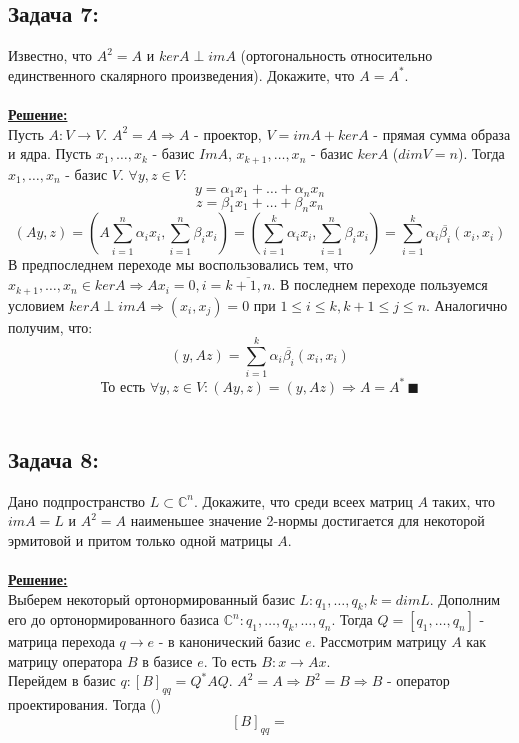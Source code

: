 \documentclass[a4paper,12pt,titlepage,final]{article}
\begin{document}
\subsection*{Задача 7:}
\noindent Известно, что $A^2 = A$ и $kerA \perp imA$ (ортогональность относительно единственного скалярного произведения). Докажите, что $A = A^*$. \\ \\
\textbf{\underline{Решение:}} \\
Пусть $A: V \rightarrow V$. $A^2 = A \Rightarrow A$ - проектор, $V = imA + kerA$ - прямая сумма образа и ядра. Пусть $x_1, \ldots, x_k$ - базис $ImA$, $x_{k+1}, \ldots, x_n$ - базис $kerA$ ($dimV = n$).
Тогда $x_1, \ldots, x_n$ - базис $V$. $\forall y, z \in V$:
$$y = \alpha_1x_1 + \ldots + \alpha_nx_n$$
$$z = \beta_1x_1 + \ldots + \beta_nx_n$$
$$(Ay, z) = (A\sum_{i=1}^n\alpha_ix_i, \sum_{i=1}^n\beta_ix_i) = (\sum_{i=1}^k\alpha_ix_i, \sum_{i=1}^n\beta_ix_i) = \sum_{i=1}^k\alpha_i\overline{\beta_i}(x_i, x_i)$$
В предпоследнем переходе мы воспользовались тем, что $x_{k+1}, \ldots, x_n \in kerA \Rightarrow Ax_i = 0, i = \overline{k+1, n}$. В последнем переходе пользуемся условием $kerA \perp imA \Rightarrow (x_i, x_j) = 0$ при $1 \leq i \leq k, k + 1 \leq j \leq n$.
Аналогично получим, что:
$$(y, Az) = \sum_{i=1}^k\alpha_i\overline{\beta_i}(x_i, x_i)$$
$$\text{То есть } \forall y, z \in V: (Ay, z) = (y, Az) \Rightarrow A = A^* \, \blacksquare$$ \\

\subsection*{Задача 8:}
\noindent Дано подпространство $L \subset \mathbb{C}^n$. Докажите, что среди всеех матриц $A$ таких, что $imA = L$ и $A^2 = A$ наименьшее значение 2-нормы достигается для некоторой эрмитовой и притом только одной матрицы $A$. \\ \\
\textbf{\underline{Решение:}} \\
Выберем некоторый ортонормированный базис $L: q_1, \ldots, q_k, k = dimL$. Дополним его до ортонормированного базиса $\mathbb{C}^n: q_1, \ldots, q_k, \ldots, q_n$.
Тогда $Q = [q_1, \ldots, q_n]$ - матрица перехода $q \to e$ - в канонический базис $e$.
Рассмотрим матрицу $A$ как матрицу оператора $B$ в базисе $e$. То есть $B: x \to Ax$. \\
Перейдем в базис $q: [B]_{qq} = Q^*AQ$. $A^2 = A \Rightarrow B^2 = B \Rightarrow B$ - оператор проектирования. Тогда
()
$$[B]_{qq} = 
$$
\end{document}
